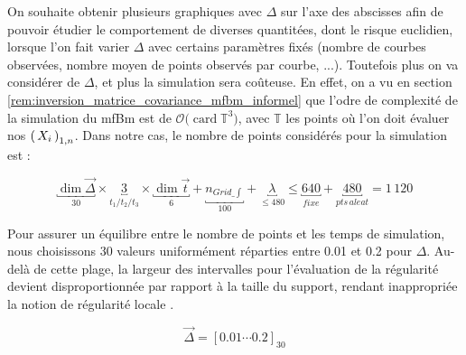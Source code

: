 
On souhaite obtenir plusieurs graphiques avec $\Delta$ sur l'axe des abscisses afin de pouvoir étudier le comportement de diverses quantitées, dont le risque euclidien, lorsque l'on fait varier $\Delta$ avec certains paramètres fixés (nombre de courbes observées, nombre moyen de points observés par courbe, ...). Toutefois plus on va considérer de $\Delta$, et plus la simulation sera coûteuse. En effet, on a vu en section \ref{rem:inversion_matrice_covariance_mfbm_informel} que l'odre de complexité de la simulation du mfBm est de $\mathcal O \bigl( \operatorname{card} \mathds T^3 \bigr)$, avec $\mathds T$ les points où l'on doit évaluer nos $\left( \, {X} _ {i} \, \right)_{1, n}$. Dans notre cas, le nombre de points considérés pour la simulation est :

\begin{equation*}
	\underbracket{\dim \vec\Delta}_{30} \times \underbracket{3}_{t_1 / t_2 / t_3} \times \underbracket{\dim \vec t}_{6} + \underbracket{n_{Grid\_\int}}_{100} + \underbracket{\lambda}_{\leq 480} \leq \underbracket{640}_{fixe} + \underbracket{480}_{pts \, aleat} = 1 \, 120
\end{equation*}

Pour assurer un équilibre entre le nombre de points et les temps de simulation, nous choisissons 30 valeurs uniformément réparties entre 0.01 et 0.2 pour $\Delta$. Au-delà de cette plage, la largeur des intervalles pour l'évaluation de la régularité devient disproportionnée par rapport à la taille du support, rendant inappropriée la notion de \og régularité locale \fg.

\begin{equation*}
	\vec \Delta = \left[ 0.01 \cdots  0.2 \right]_{30}
\end{equation*}
